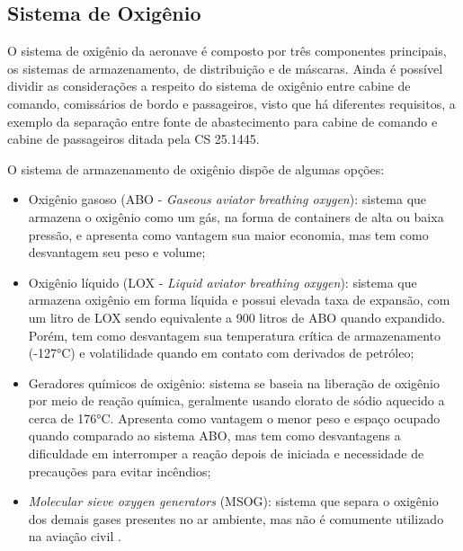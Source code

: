 \subsection{Sistema de Oxigênio}

O sistema de oxigênio da aeronave é composto por três componentes principais, os sistemas de armazenamento, de distribuição e de máscaras. Ainda é possível dividir as considerações a respeito do sistema de oxigênio entre cabine de comando, comissários de bordo e passageiros, visto que há diferentes requisitos, a exemplo da separação entre fonte de abastecimento para cabine de comando e cabine de passageiros ditada pela CS 25.1445.

O sistema de armazenamento de oxigênio dispõe de algumas opções: 
\begin{itemize}
    \item Oxigênio gasoso (ABO - \textit{Gaseous aviator breathing oxygen}): sistema que armazena o oxigênio como um gás, na forma de containers de alta ou baixa pressão, e apresenta como vantagem sua maior economia, mas tem como desvantagem seu peso e volume;
    \item Oxigênio líquido (LOX - \textit{Liquid aviator breathing oxygen}): sistema que armazena oxigênio em forma líquida e possui elevada taxa de expansão, com um litro de LOX sendo equivalente a 900 litros de ABO quando expandido. Porém, tem como desvantagem sua temperatura crítica de armazenamento (-127°C) e volatilidade quando em contato com derivados de petróleo;
    \item Geradores químicos de oxigênio: sistema se baseia na liberação de oxigênio por meio de reação química, geralmente usando clorato de sódio aquecido a cerca de 176°C. Apresenta como vantagem o menor peso e espaço ocupado quando comparado ao sistema ABO, mas tem como desvantagens a dificuldade em interromper a reação depois de iniciada e necessidade de precauções para evitar incêndios;
    \item \textit{Molecular sieve oxygen generators} (MSOG): sistema que separa o oxigênio dos demais gases presentes no ar ambiente, mas não é comumente utilizado na aviação civil \cite{OxiEquip}.
\end{itemize}

